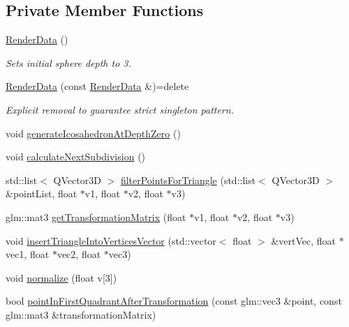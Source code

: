 \subsection*{Private Member Functions}
\begin{DoxyCompactItemize}
\item 
\hyperlink{class_render_data_a16b04b2437ea3fa034381a138cbf2f83}{Render\+Data} ()
\begin{DoxyCompactList}\small\item\em Sets initial sphere depth to 3. \end{DoxyCompactList}\item 
\hyperlink{class_render_data_ab5f9324f666abc4b85fd2c6ed868c6be}{Render\+Data} (const \hyperlink{class_render_data}{Render\+Data} \&)=delete
\begin{DoxyCompactList}\small\item\em Explicit removal to guarantee strict singleton pattern. \end{DoxyCompactList}\item 
void \hyperlink{class_render_data_adee024bdbedaae2cfd38bb2038b4aa48}{generate\+Icosahedron\+At\+Depth\+Zero} ()
\item 
void \hyperlink{class_render_data_ac1bbf9770f040e452f676358ee699767}{calculate\+Next\+Subdivision} ()
\item 
std\+::list$<$ Q\+Vector3D $>$ \hyperlink{class_render_data_af74f8858b9e0dedb914f24390e140a04}{filter\+Points\+For\+Triangle} (std\+::list$<$ Q\+Vector3D $>$ \&point\+List, float $\ast$v1, float $\ast$v2, float $\ast$v3)
\item 
glm\+::mat3 \hyperlink{class_render_data_afbc604f853739d0198c9da5097987fa7}{get\+Transformation\+Matrix} (float $\ast$v1, float $\ast$v2, float $\ast$v3)
\item 
void \hyperlink{class_render_data_a4fca77ce81a628de0ddaeb7d75a4c371}{insert\+Triangle\+Into\+Vertices\+Vector} (std\+::vector$<$ float $>$ \&vert\+Vec, float $\ast$vec1, float $\ast$vec2, float $\ast$vec3)
\item 
void \hyperlink{class_render_data_ad8c590fd11eda06875112a74d318267f}{normalize} (float v\mbox{[}3\mbox{]})
\item 
bool \hyperlink{class_render_data_a7b32e615d46ac5ffbd3d14de0da2c406}{point\+In\+First\+Quadrant\+After\+Transformation} (const glm\+::vec3 \&point, const glm\+::mat3 \&transformation\+Matrix)
\end{DoxyCompactItemize}
